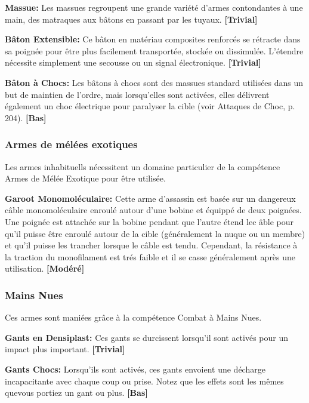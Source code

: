 \textbf{Massue:} Les massues regroupent une grande variété d'armes contondantes à une main, des matraques aux bâtons en passant par les tuyaux. \textbf{[Trivial]} 

\textbf{Bâton Extensible:} Ce bâton en matériau composites renforcés se rétracte dans sa poignée pour être plus facilement transportée, stockée ou dissimulée. L'étendre nécessite simplement une secousse ou un signal électronique. \textbf{[Trivial]} 

\textbf{Bâton à Chocs:} Les bâtons à chocs sont des massues standard utilisées dans un but de maintien de l'ordre, mais lorsqu'elles sont activées, elles délivrent également un choc électrique pour paralyser la cible (voir Attaques de Choc, p. 204). \textbf{[Bas]} 

\subsubsection{Armes de mélées exotiques} 

Les armes inhabituells nécessitent un domaine particulier de la compétence Armes de Mélée Exotique pour être utilisée. 

\textbf{Garoot Monomoléculaire:} Cette arme d'assassin est basée sur un dangereux câble monomoléculaire enroulé autour d'une bobine et équippé de deux poignées. Une poignée est attachée sur la bobine pendant que l'autre étend lec âble pour qu'il puisse être enroulé autour de la cible (généralement la nuque ou un membre) et qu'il puisse les trancher lorsque le câble est tendu. Cependant, la résistance à la traction du monofilament est trés faible et il se casse généralement après une utilisation. \textbf{[Modéré]} 

\subsubsection{Mains Nues} 

Ces armes sont maniées grâce à la compétence Combat à Mains Nues. 

\textbf{Gants en Densiplast:} Ces gants se durcissent lorsqu'il sont activés pour un impact plus important. \textbf{[Trivial]} 

\textbf{Gants Chocs:} Lorsqu'ils sont activés, ces gants envoient une décharge incapacitante avec chaque coup ou prise. Notez que les effets sont les mêmes quevous portiez un gant ou plus. \textbf{[Bas]} 

